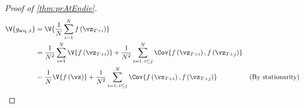\prAtEndRestateiv*
\label{proofsection:prAtEndiv}\begin{proof}[Proof of \autoref{thm:prAtEndiv}]\label{proof:prAtEndiv}\begin {align} \V {g_{\mathrm {seq., t}}} &= \V { \frac {1}{N} \sum _{i=1}^{N} f\left (\vz _{T + i}\right ) } \\ &= \frac {1}{N^2} \sum _{i=1}^{N} \V { f\left (\vz _{T+i}\right ) } + \frac {1}{N^2} \sum _{i=1,\, i \leq j}^{N} \Cov { f\left (\vz _{T+i}\right ), f\left (\vz _{T+j}\right ) } \\ &= \frac {1}{N} \V { f\left (\vz \right ) } + \frac {1}{N^2} \sum _{i=1,\, i \leq j}^{N} \Cov { f\left (\vz _{T+i}\right ), f\left (\vz _{T+j}\right ) } &\text {(By stationarity)} \\ \end {align}\end{proof}
\prAtEndRestatev*
